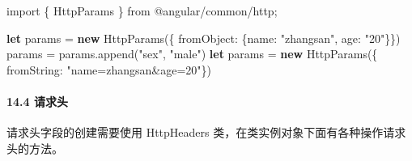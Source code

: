 \documentclass[
]{article}
\newenvironment{Shaded}{}{}
\newcommand{\DataTypeTok}[1]{\textcolor[rgb]{0.56,0.13,0.00}{#1}}
\newcommand{\FunctionTok}[1]{\textcolor[rgb]{0.02,0.16,0.49}{#1}}
\newcommand{\ImportTok}[1]{#1}
\newcommand{\KeywordTok}[1]{\textcolor[rgb]{0.00,0.44,0.13}{\textbf{#1}}}
\newcommand{\NormalTok}[1]{#1}
\newcommand{\OperatorTok}[1]{\textcolor[rgb]{0.40,0.40,0.40}{#1}}
\newcommand{\StringTok}[1]{\textcolor[rgb]{0.25,0.44,0.63}{#1}}
\begin{document}
\begin{enumerate}
\begin{Shaded}
\begin{Highlighting}[]
\ImportTok{import}\NormalTok{ \{ HttpParams \} }\ImportTok{from} \StringTok{\textquotesingle{}@angular/common/http\textquotesingle{}}\OperatorTok{;}

\KeywordTok{let}\NormalTok{ params }\OperatorTok{=} \KeywordTok{new} \FunctionTok{HttpParams}\NormalTok{(\{ }\DataTypeTok{fromObject}\OperatorTok{:}\NormalTok{ \{}\DataTypeTok{name}\OperatorTok{:} \StringTok{"zhangsan"}\OperatorTok{,} \DataTypeTok{age}\OperatorTok{:} \StringTok{"20"}\NormalTok{\}\})}
\NormalTok{params }\OperatorTok{=}\NormalTok{ params}\OperatorTok{.}\FunctionTok{append}\NormalTok{(}\StringTok{"sex"}\OperatorTok{,} \StringTok{"male"}\NormalTok{)}
\KeywordTok{let}\NormalTok{ params }\OperatorTok{=} \KeywordTok{new} \FunctionTok{HttpParams}\NormalTok{(\{ }\DataTypeTok{fromString}\OperatorTok{:} \StringTok{"name=zhangsan\&age=20"}\NormalTok{\})}
\end{Highlighting}
\end{Shaded}
\end{enumerate}

\hypertarget{144-ux8bf7ux6c42ux5934}{%
\paragraph{14.4 请求头}\label{144-ux8bf7ux6c42ux5934}}

请求头字段的创建需要使用 HttpHeaders
类，在类实例对象下面有各种操作请求头的方法。
\end{document}

